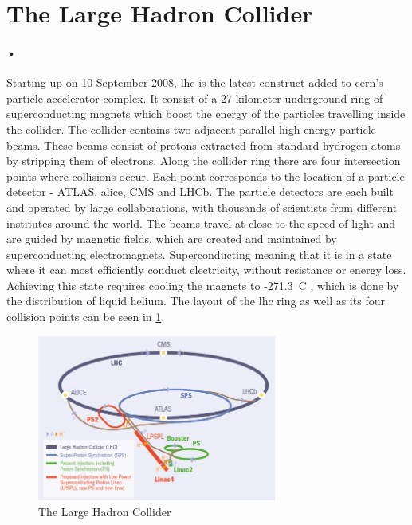 \documentclass[a4paper, 12pt]{report}
\begin{document}
\section{The Large Hadron Collider}
\label{sec:lhc}
\paragraph{•}
Starting up on 10 September 2008, \gls{lhc} is the latest construct added to \gls{cern}'s particle accelerator complex\cite{lhc}.
It consist of a 27 kilometer underground ring of superconducting magnets which boost the energy of the particles travelling inside the collider.
The collider contains two adjacent parallel high-energy particle beams.
These beams consist of protons extracted from standard hydrogen atoms by stripping them of electrons.
Along the collider ring there are four intersection points where collisions occur.
Each point corresponds to the location of a particle detector - ATLAS, \gls{alice}, CMS and LHCb.
The particle detectors are each built and operated by large collaborations, with thousands of scientists from different institutes around the world.
The beams travel at close to the speed of light and are guided by magnetic fields, which are created and maintained by superconducting electromagnets.
Superconducting meaning that it is in a state where it can most efficiently conduct electricity, without resistance or energy loss.
Achieving this state requires cooling the magnets to -271.3\degree~C , which is done by the distribution of liquid helium.
The layout of the \gls{lhc} ring as well as its four collision points can be seen in \ref{fig:lhc}.

\begin{figure}[h!]
  \centering
    \includegraphics[width=0.7\textwidth]{images/lhc-ring.jpg}
     \caption[The Large Hadron Collider]{The Large Hadron Collider \cite{lhc-ring-image}}
    \label{fig:lhc}
\end{figure}
\end{document}
